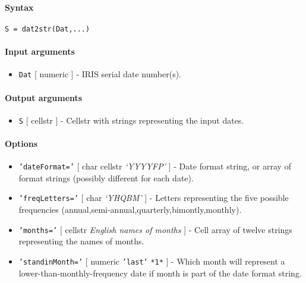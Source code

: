 


	\paragraph{Syntax}

\begin{verbatim}
S = dat2str(Dat,...)
\end{verbatim}

\paragraph{Input arguments}

\begin{itemize}
\itemsep1pt\parskip0pt
\item
  \texttt{Dat} {[} numeric {]} - IRIS serial date number(s).
\end{itemize}

\paragraph{Output arguments}

\begin{itemize}
\itemsep1pt\parskip0pt
\item
  \texttt{S} {[} cellstr {]} - Cellstr with strings representing the
  input dates.
\end{itemize}

\paragraph{Options}

\begin{itemize}
\item
  \texttt{'dateFormat='} {[} char \textbar{} cellstr \textbar{}
  \emph{`YYYYFP'} {]} - Date format string, or array of format strings
  (possibly different for each date).
\item
  \texttt{'freqLetters='} {[} char \textbar{} \emph{`YHQBM'} {]} -
  Letters representing the five possible frequencies
  (annual,semi-annual,quarterly,bimontly,monthly).
\item
  \texttt{'months='} {[} cellstr \textbar{} \emph{English names of
  months} {]} - Cell array of twelve strings representing the names of
  months.
\item
  \texttt{'standinMonth='} {[} numeric \textbar{} \texttt{'last'}
  \textbar{} \texttt{*1*} {]} - Which month will represent a
  lower-than-monthly-frequency date if month is part of the date format
  string.
\end{itemize}

